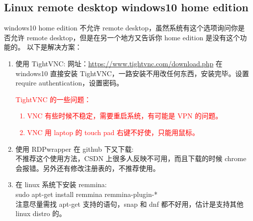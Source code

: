 \documentclass[UTF8,fancyhdr,a4paper]{ctexart}
\newcommand{\pflred}[1]{\textcolor{red}{#1}}
\begin{document}
\subsection{Linux remote desktop windows10 home edition}
windows10 home edition 不允许 remote desktop，虽然系统有这个选项询问你是否允许 remote desktop，但是在另一个地方又告诉你 home edition 是没有这个功能的。
以下是解决方案：
\begin{enumerate}
      \item 使用 TightVNC:
            网址：\url{https://www.tightvnc.com/download.php}
            在 windows10 直接安装 TightVNC，一路安装不用改任何东西，安装完毕。设置require authentication，设置密码。\\
            \pflred
            {TightVNC 的一些问题：
                  \begin{enumerate}
                        \item VNC 有些时候不稳定，需要重启系统，有可能是 VPN 的问题。
                        \item VNC 用 laptop 的 touch pad 右键不好使，只能用鼠标。
                  \end{enumerate}
            }



      \item 使用 RDPwrapper 在 github 下又下载:\\
            不推荐这个使用方法，CSDN 上很多人反映不可用，而且下载的时候 chrome 会报错。另外还有修改注册表的，不推荐使用。
      \item 在 linux 系统下安装 remmina:\\
            sudo apt-get install remmina remmina-plugin-*\\
            注意尽量需找 apt-get 支持的语句，snap 和 dnf 都不好用，估计是支持其他 linux distro 的。




\end{enumerate}
\end{document}

